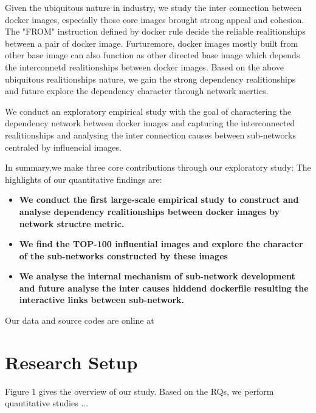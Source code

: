 \documentclass[sigconf]{acmart}
\begin{document}
Given the ubiquitous nature in industry, we study the inter connection between docker images, especially those core images brought strong appeal and cohesion. The "FROM" instruction defined by docker rule decide the reliable realitionships between a pair of docker image. Furturemore, docker images mostly built from other base image can also function as other directed base image which depends the interconnetd realitionships between docker images. Based on the above ubiquitous realitionships nature, we gain the strong dependency realitionships and future explore the dependency character through network mertics. 

We conduct an exploratory empirical study with the goal of charactering the dependency network between docker images and capturing the interconnected realitionships and analysing the inter connection causes between sub-networks centraled by influencial images.
 
In summary,we make three core contributions through our exploratory study:
The highlights of our quantitative findings are:

\begin{itemize}
\item \textbf{We conduct the first large-scale empirical study to construct and analyse dependency realitionships between docker images by network structre metric.}
\item \textbf{We find the TOP-100 influential images and explore the character of the sub-networks constructed by these images}
\item \textbf{We analyse the internal mechanism of sub-network development and future analyse the inter causes hiddend dockerfile resulting the interactive links between sub-network.}
\end{itemize}

Our data and source codes are online at









\section{Research Setup}
Figure 1 gives the overview of our study. Based on the RQs, we perform quantitative studies ...
\end{document}
